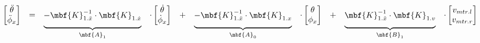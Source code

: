 \documentclass[crop=false,float=true,class=scrreprt]{standalone}
\begin{document}
\begin{equation}
\begin{array}{ccccccccccc}
& \hphantom{\cdot}
\begin{bmatrix}
\ddot{\theta}  \\
\ddot{\phi}_{x}\\
\end{bmatrix}
& = &
\underbrace{
\vphantom{\begin{bmatrix} a \\ a \\ \end{bmatrix}}
\begin{matrix}
-\mbf{K}_{1.\ddot{x}}^{-1}
\cdot 
\mbf{K}_{1.\dot{x}}
\end{matrix}
}_{\mbf{A}_{1}}
& \cdot 
\begin{bmatrix}
\dot{\theta}  \\
\dot{\phi}_{x}\\
\end{bmatrix}
& + &
\underbrace{
\vphantom{\begin{bmatrix} a \\ a \\ \end{bmatrix}}
\begin{matrix}
-\mbf{K}_{1.\ddot{x}}^{-1}
\cdot 
\mbf{K}_{1.x}
\end{matrix}
}_{\mbf{A}_{0}}
& \cdot 
\begin{bmatrix}
\theta  \\
\phi_{x}\\
\end{bmatrix}
& + &
\underbrace{
\vphantom{\begin{bmatrix} a \\ a \\ \end{bmatrix}}
\begin{matrix}
\mbf{K}_{1.\ddot{x}}^{-1}
\cdot 
\mbf{K}_{1.v}
\end{matrix}
}_{\mbf{B}_{1}}
& \cdot
\begin{bmatrix}
v_{mtr.l}\\
v_{mtr.r}\\
\end{bmatrix}
\end{array}
\end{equation}




\vspace{+1em}
\end{document}
